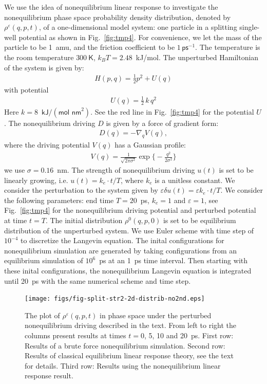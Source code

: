 \documentclass[]{tMPH2e}
\newcommand{\recheck}[1]{{\color{red} #1}}
\newcommand{\eps}{\varepsilon}
\begin{document}
We use the idea of nonequilibrium linear response to investigate the
nonequilibrium phase space probability density distribution, denoted by $\rho^\eps(q, p, t)$, of a one-dimensional model system: one particle in a
splitting single-well potential as shown in Fig.~\ref{fig:tmp4}.  For convenience, we let the mass of
the particle to be 1~\textsf{amu}, and the friction coefficient to be
$1\,\textsf{ps}^{-1}$.
The temperature is the
room temperature $300\ \textsf{K}$, $k_BT = 2.48$~\textsf{kJ/mol}.
The unperturbed Hamiltonian of the system is
given by:
\begin{align}
  H ( p,  q) = \frac 12  p^2 + U( q) 
\end{align}
with potential
\begin{align}
  U( q) = \frac12\,k\, q^2 
\end{align}
Here $k = 8$~$\textsf{kJ} / (\textsf{mol nm}^2)$.
See the red line in Fig.~\ref{fig:tmp4} for the  potential $U$.
The nonequilibrium driving $ D$ is given by a force of gradient form:
\begin{align}
   D( q) = -\nabla_{ q} V( q) ,
\end{align}
where the driving potential $V( q)$ has a Gaussian profile:
\begin{align}
  V( q) = \frac{1}{\sqrt{2\pi \sigma^2}}
  \exp\Big\{-\frac{ q^2}{2\sigma^2}\Big\}
\end{align}
we use $\sigma = 0.16$~\textsf{nm}.  The strength of nonequilibrium
driving $u(t)$ is set to be linearly growing, i.e. $ u(t) = k_e\cdot t/T$,
where $k_e$ is a unitless constant.
We
consider the perturbation to the system given by $\eps\delta u(t) = \eps k_e \cdot t/T$.
We consider the following parameters: end time $T = 20$~\textsf{ps}, 
$k_e = 1$ and $\eps = 1$, see Fig.~\ref{fig:tmp4}
for the nonequilibrium driving potential and perturbed
potential at time $t = T$. The initial distribution $\rho^0(q, p, 0)$ is set to
be equilibrium distribution of the unperturbed system.
\recheck{
  We use Euler scheme with time step of $10^{-4}$ to discretize the
  Langevin equation. The inital configurations for nonequilibrium
  simulation are generated by taking configurations
  from an equilibrium simulation of $10^6$~\textsf{ps} at an 1~\textsf{ps} time interval.
  Then starting with these inital configurations,  the nonequilibrium
  Langevin equation is integrated until 20~\textsf{ps} with the same numerical
  scheme and time step.
}

\begin{figure}
  \centering
  \texttt{[image: figs/fig-split-str2-2d-distrib-no2nd.eps]}
  \caption{ The plot of $ \rho^\eps(q,p,t)$ in  phase
    space under the perturbed nonequilibrium driving described in the text. From left to right the columns present results at times $t =
    0$, 5, 10 and 20~\textsf{ps}.  First row: Results of a brute force
    nonequilibrium simulation. Second row: Results of
    classical equilibrium linear response theory, see the text for details. Third row: Results using the
    nonequilibrium linear response result.  }
  \label{fig:tmp6}
\end{figure}
\end{document}
